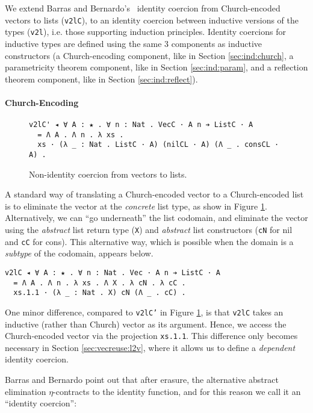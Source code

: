 \documentclass[a4paper,envcountsame,envcountsect]{llncs}
\newcommand{\refsec}[1]{Section \ref{sec:#1}}
\newcommand{\reffig}[1]{Figure \ref{fig:#1}}
\newcommand{\labfig}[1]{\label{fig:#1}}
\begin{document}
We extend Barras and Bernardo's~\cite{barras:implicit} identity
coercion from Church-encoded vectors to lists (\texttt{v2lC}),
to an identity coercion between inductive versions
of the types (\texttt{v2l}), i.e. those supporting induction
principles.
Identity coercions for inductive types are defined
using the same 3 components as inductive constructors (a
Church-encoding component, like in \refsec{ind:church},
a parametricity theorem component, like in \refsec{ind:param}, and a
reflection theorem component, like in \refsec{ind:reflect}).

\paragraph{Church-Encoding}

\begin{figure}[t]
\centering
\begin{verbatim}
v2lC' ◂ ∀ A : ★ . ∀ n : Nat . VecC · A n ➔ ListC · A
  = Λ A . Λ n . λ xs .
  xs · (λ _ : Nat . ListC · A) (nilCL · A) (Λ _ . consCL · A) .
\end{verbatim}
\caption{Non-identity coercion from vectors to lists.}
\labfig{nonident}
\end{figure}

A standard way of translating a Church-encoded vector to a
Church-encoded list is to eliminate the vector at the \textit{concrete} list
type, as show in \reffig{nonident}. Alternatively, we can
``go underneath'' the list codomain, and eliminate the vector using
the \textit{abstract} list return type (\texttt{X}) and
\textit{abstract} list constructors
(\texttt{cN} for nil and \texttt{cC} for cons). This alternative way,
which is possible when the domain is a \textit{subtype} of the
codomain, appears below.

\begin{verbatim}
v2lC ◂ ∀ A : ★ . ∀ n : Nat . Vec · A n ➔ ListC · A
  = Λ A . Λ n . λ xs . Λ X . λ cN . λ cC .
  xs.1.1 · (λ _ : Nat . X) cN (Λ _ . cC) .
\end{verbatim}

One minor difference, compared to \texttt{v2lC'} in \reffig{nonident},
is that \texttt{v2lC} takes an inductive (rather than Church) vector as its
argument. Hence, we access the Church-encoded vector via the
projection \texttt{xs.1.1}.
This difference only becomes necessary in
\refsec{vecreuse:l2v}, where it allows us to define a
\textit{dependent} identity coercion.

Barras and Bernardo point out that after erasure, the alternative
abstract elimination $\eta$-contracts to the identity
function, and for this reason we call it an
``identity coercion'':
\end{document}
